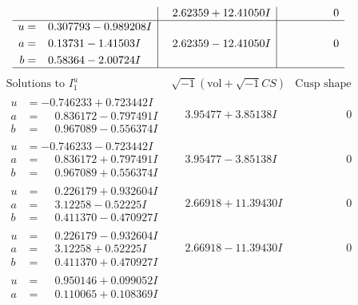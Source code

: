 \documentclass[1p]{elsarticle_modified}
\theoremstyle{definition}
\newcommand{\I}{\sqrt{-1}}
\begin{document}
$$\begin{array}{c|c|c}
 & \phantom{-}2.62359 + 12.41050 I & \phantom{-0.000000 } 0 \\ \hline\begin{aligned}
u &= \phantom{-}0.307793 - 0.989208 I \\
a &= \phantom{-}0.13731 - 1.41503 I \\
b &= \phantom{-}0.58364 - 2.00724 I\end{aligned}
 & \phantom{-}2.62359 - 12.41050 I & \phantom{-0.000000 } 0\\
 \hline 
 \end{array}$$\newpage$$\begin{array}{c|c|c}  
\text{Solutions to }I^u_{1}& \I (\text{vol} + \sqrt{-1}CS) & \text{Cusp shape}\\
 \hline 
\begin{aligned}
u &= -0.746233 + 0.723442 I \\
a &= \phantom{-}0.836172 - 0.797491 I \\
b &= \phantom{-}0.967089 - 0.556374 I\end{aligned}
 & \phantom{-}3.95477 + 3.85138 I & \phantom{-0.000000 } 0 \\ \hline\begin{aligned}
u &= -0.746233 - 0.723442 I \\
a &= \phantom{-}0.836172 + 0.797491 I \\
b &= \phantom{-}0.967089 + 0.556374 I\end{aligned}
 & \phantom{-}3.95477 - 3.85138 I & \phantom{-0.000000 } 0 \\ \hline\begin{aligned}
u &= \phantom{-}0.226179 + 0.932604 I \\
a &= \phantom{-}3.12258 - 0.52225 I \\
b &= \phantom{-}0.411370 - 0.470927 I\end{aligned}
 & \phantom{-}2.66918 + 11.39430 I & \phantom{-0.000000 } 0 \\ \hline\begin{aligned}
u &= \phantom{-}0.226179 - 0.932604 I \\
a &= \phantom{-}3.12258 + 0.52225 I \\
b &= \phantom{-}0.411370 + 0.470927 I\end{aligned}
 & \phantom{-}2.66918 - 11.39430 I & \phantom{-0.000000 } 0 \\ \hline\begin{aligned}
u &= \phantom{-}0.950146 + 0.099052 I \\
a &= \phantom{-}0.110065 + 0.108369 I \\

\end{aligned}
\end{array}$$
\end{document}
